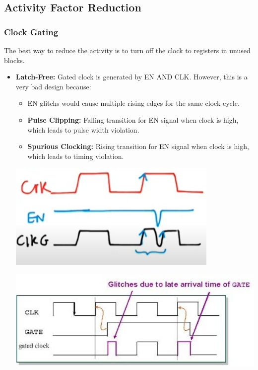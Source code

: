 \documentclass[11pt]{article}
\begin{document}
\subsection*{Activity Factor Reduction}
\subsubsection*{Clock Gating}
The best way to reduce the activity is to turn off the clock to registers in unused blocks.
\begin{itemize}
    \item \textbf{Latch-Free:} Gated clock is generated by EN AND CLK. However, this is a very bad design because:
        \begin{itemize}
            \item EN glitchs would cause multiple rising edges for the same clock cycle.
            \item \textbf{Pulse Clipping:} Falling transition for EN signal when clock is high, which leads to pulse width violation.
            \item \textbf{Spurious Clocking:} Rising transition for EN signal when clock is high, which leads to timing violation.
        \end{itemize}
        \begin{multicols}{2}
            \begin{minipage}{\linewidth}
                \begin{center}
                    \includegraphics[width=0.8\textwidth]{1.png}
                \end{center}
            \end{minipage}
            \begin{minipage}{\linewidth}
                \begin{center}
                    \includegraphics[width=1\textwidth]{2.jpeg}

\end{center}
\end{minipage}
\end{multicols}
\end{itemize}
\end{document}
